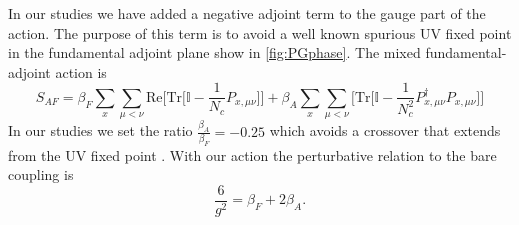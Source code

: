 In our studies we have added a negative adjoint term to the gauge part of the action.
The purpose of this term is to avoid a well known spurious UV fixed point \cite{PhysRevD.24.3212,Bhanot1982337,Blum1995301} in the fundamental adjoint plane show in \ref{fig:PGphase}.
The mixed fundamental-adjoint action is
\begin{equation}
  S_{AF}=\beta_F\sum_{x} \sum_{\mu<\nu} \mbox{Re}\Big[\mbox{Tr}\big[\mathbb{I}-\frac{1}{N_c}P_{x,\mu\nu}\big]\Big] + \beta_A\sum_{x} \sum_{\mu<\nu}\Big[\mbox{Tr}\big[\mathbb{I}-\frac{1}{N_c^2}P_{x,\mu\nu}^\dagger P_{x,\mu\nu}\big]\Big]
\end{equation}
In our studies we set the ratio $\frac{\beta_A}{\beta_F}=-0.25$ which avoids a crossover that extends from the UV fixed point \cite{Hasenfratz:2010fi}.
With our action the perturbative relation to the bare coupling is
\begin{equation}
  \frac{6}{g^2}=\beta_F+2\beta_A.
\end{equation}

